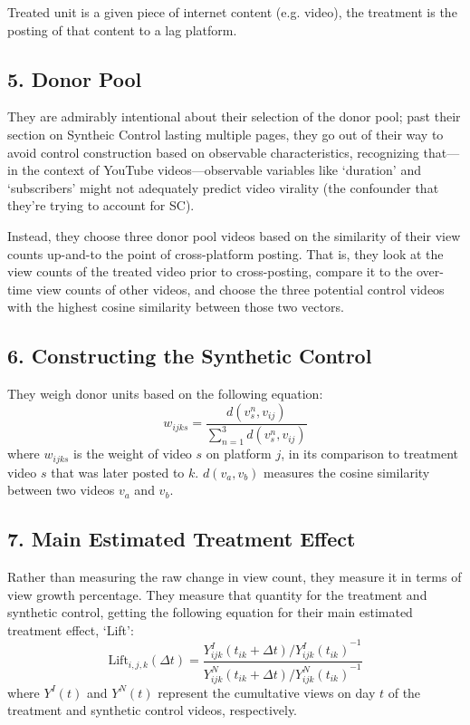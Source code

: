 \documentclass{article}
\begin{document}
Treated unit is a given piece of internet content (e.g. video), the treatment is the posting of that content to a lag platform.

\subsection*{5. Donor Pool}

They are admirably intentional about their selection of the donor pool; past their section on Syntheic Control lasting multiple pages, they go out of their way to avoid control construction based on observable characteristics, recognizing that—in the context of YouTube videos—observable variables like `duration' and `subscribers' might not adequately predict video virality (the confounder that they're trying to account for SC).

Instead, they choose three donor pool videos based on the similarity of their view counts up-and-to the point of cross-platform posting. That is, they look at the view counts of the treated video prior to cross-posting, compare it to the over-time view counts of other videos, and choose the three potential control videos with the highest cosine similarity between those two vectors.

\subsection*{6. Constructing the Synthetic Control}

They weigh donor units based on the following equation:
$$w_{ijks} = \frac{d(v_s^n, v_{ij})}{\sum_{n=1}^{3} d(v_s^n, v_{ij})}$$
where $w_{ijks}$ is the weight of video $s$ on platform $j$, in its comparison to treatment video $s$ that was later posted to $k$. $d(v_a, v_b)$ measures the cosine similarity between two videos $v_a$ and $v_b$.

\subsection*{7. Main Estimated Treatment Effect}

Rather than measuring the raw change in view count, they measure it in terms of view growth percentage. They measure that quantity for the treatment and synthetic control, getting the following equation for their main estimated treatment effect, `Lift':
$$\text{Lift}_{i,j,k}(\Delta t) = \frac{Y^I_{ijk}(t_{ik} + \Delta t) / {Y^I_{ijk}(t_{ik})}^{-1}}{Y^N_{ijk}(t_{ik} + \Delta t) / {Y^N_{ijk}(t_{ik})}^{-1}}$$
where $Y^I(t)$ and $Y^N(t)$ represent the cumultative views on day $t$ of the treatment and synthetic control videos, respectively.
\end{document}
